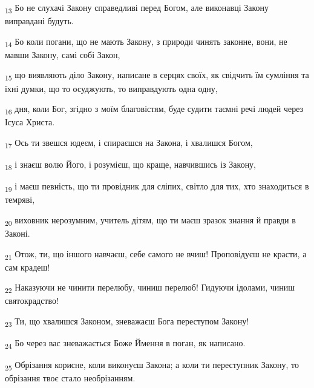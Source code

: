\begin{tcolorbox}
\textsubscript{13} Бо не слухачі Закону справедливі перед Богом, але виконавці Закону виправдані будуть.
\end{tcolorbox}
\begin{tcolorbox}
\textsubscript{14} Бо коли погани, що не мають Закону, з природи чинять законне, вони, не мавши Закону, самі собі Закон,
\end{tcolorbox}
\begin{tcolorbox}
\textsubscript{15} що виявляють діло Закону, написане в серцях своїх, як свідчить їм сумління та їхні думки, що то осуджують, то виправдують одна одну,
\end{tcolorbox}
\begin{tcolorbox}
\textsubscript{16} дня, коли Бог, згідно з моїм благовістям, буде судити таємні речі людей через Ісуса Христа.
\end{tcolorbox}
\begin{tcolorbox}
\textsubscript{17} Ось ти звешся юдеєм, і спираєшся на Закона, і хвалишся Богом,
\end{tcolorbox}
\begin{tcolorbox}
\textsubscript{18} і знаєш волю Його, і розумієш, що краще, навчившись із Закону,
\end{tcolorbox}
\begin{tcolorbox}
\textsubscript{19} і маєш певність, що ти провідник для сліпих, світло для тих, хто знаходиться в темряві,
\end{tcolorbox}
\begin{tcolorbox}
\textsubscript{20} виховник нерозумним, учитель дітям, що ти маєш зразок знання й правди в Законі.
\end{tcolorbox}
\begin{tcolorbox}
\textsubscript{21} Отож, ти, що іншого навчаєш, себе самого не вчиш! Проповідуєш не красти, а сам крадеш!
\end{tcolorbox}
\begin{tcolorbox}
\textsubscript{22} Наказуючи не чинити перелюбу, чиниш перелюб! Гидуючи ідолами, чиниш святокрадство!
\end{tcolorbox}
\begin{tcolorbox}
\textsubscript{23} Ти, що хвалишся Законом, зневажаєш Бога переступом Закону!
\end{tcolorbox}
\begin{tcolorbox}
\textsubscript{24} Бо через вас зневажається Боже Ймення в поган, як написано.
\end{tcolorbox}
\begin{tcolorbox}
\textsubscript{25} Обрізання корисне, коли виконуєш Закона; а коли ти переступник Закону, то обрізання твоє стало необрізанням.
\end{tcolorbox}
